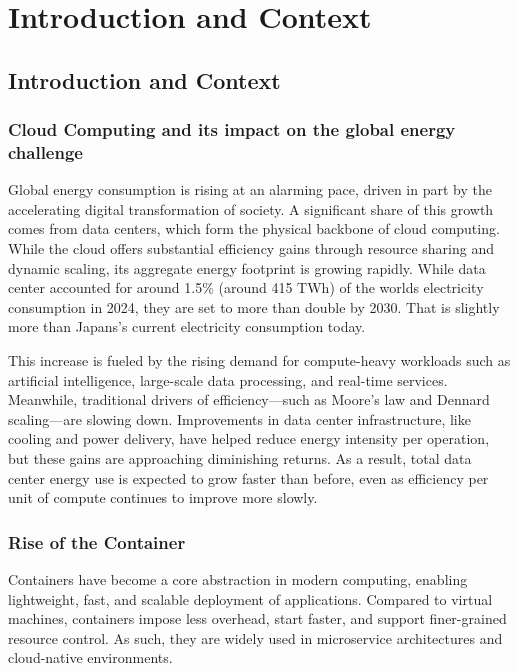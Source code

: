 \chapter{Introduction and Context} %
\label{Chapter1}

\section{Introduction and Context}

\subsection{Cloud Computing and its impact on the global energy challenge}

Global energy consumption is rising at an alarming pace, driven in part by the accelerating digital transformation of society. A significant share of this growth comes from data centers, which form the physical backbone of cloud computing. While the cloud offers substantial efficiency gains through resource sharing and dynamic scaling, its aggregate energy footprint is growing rapidly. While data center accounted for around 1.5\% (around 415 TWh) of the worlds electricity consumption in 2024, they are set to more than double by 2030\parencite{iea2025energyai}. That is slightly more than Japans's current electricity consumption today.

This increase is fueled by the rising demand for compute-heavy workloads such as artificial intelligence, large-scale data processing, and real-time services. Meanwhile, traditional drivers of efficiency—such as Moore’s law and Dennard scaling—are slowing down\parencite{tomshardware2023mooreslaw, cartesian2013dennard}. Improvements in data center infrastructure, like cooling and power delivery, have helped reduce energy intensity per operation\parencite{uptime2023pue}, but these gains are approaching diminishing returns. As a result, total data center energy use is expected to grow faster than before, even as efficiency per unit of compute continues to improve more slowly\parencite{masanet2020}.

\subsection{Rise of the Container}

Containers have become a core abstraction in modern computing, enabling lightweight, fast, and scalable deployment of applications. Compared to virtual machines, containers impose less overhead, start faster, and support finer-grained resource control. As such, they are widely used in microservice architectures and cloud-native environments\parencite{Potdar2020}.

